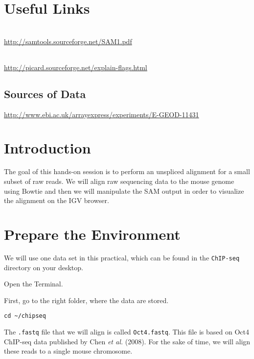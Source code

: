 \section{Useful Links}
 
\begin{description}[style=multiline,labelindent=0cm,align=left,leftmargin=0.5cm]
  \item[SAM Specification]\hfill\\
    \url{http://samtools.sourceforge.net/SAM1.pdf}
  \item[Explain SAM Flags]\hfill\\
    \url{http://picard.sourceforge.net/explain-flags.html}
\end{description}

\subsection{Sources of Data}
  \url{http://www.ebi.ac.uk/arrayexpress/experiments/E-GEOD-11431}

\clearpage

\section{Introduction}

\begin{information}
The goal of this hands-on session is to perform an unspliced alignment for a
small subset of raw reads. We will align raw sequencing data to the mouse genome
using Bowtie and then we will manipulate the SAM output in order to
visualize the alignment on the IGV browser.
\end{information}

\section{Prepare the Environment}

\begin{information}
We will use one data set in this practical, which can be found in the \texttt{ChIP-seq}
directory on your desktop.
\end{information}

\begin{steps}
Open the Terminal.

First, go to the right folder, where the data are stored.
\begin{lstlisting}
cd ~/chipseq
\end{lstlisting}

\begin{information}
The \texttt{.fastq} file that we will align is called \texttt{Oct4.fastq}. This
file is based on Oct4 ChIP-seq data published by Chen \textit{et al.} (2008). For the
sake of time, we will align these reads to a single mouse chromosome.
\end{information}
\end{steps}

